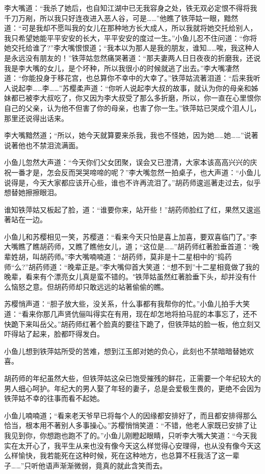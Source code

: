 \documentclass[12pt,oneside]{book}
\begin{document}
李大嘴道：``我杀了她后，也自知江湖中已无我容身之处，铁无双必定恨不得将我千刀万剐，所以我只好连夜进入恶人谷，可是\ldots\ldots{}''他瞧了铁萍姑一眼，黯然道：``可是我却不愿叫我的女儿在那种地方长大成人，所以我就将她交托给别人，我只希望她能平平安安的长大，平平安安的度过一生。''小鱼儿忍不住问道：``你将她交托给谁了?''李大嘴恨恨道；``我本以为那人是我的朋友，谁知\ldots\ldots 唉，我这种人是永远没有朋友的！''铁萍姑忽然痛哭著道：``那夫妻两人日日夜夜的折磨我，还说我是李大嘴的女儿，是个坏种，所以我很小的时候就逃了出去。''李大嘴凄然道：``你能投身于移花宫，也总算你不幸中的大幸了。''铁萍姑流著泪道：``后来我听人说起李\ldots\ldots 李\ldots\ldots{}''苏樱柔声道：``你听人说起李大叔的故事，就认为你的母亲和姊妹都已被李大叔吃了，你又因为李大叔受了那么多折磨，所以，你一直在心里恨你自己的父亲，认为他不但害了你的母亲，也害了你一生。''铁萍姑已哭成个泪人儿，那里还说得出话来。

李大嘴黯然道；``所以，她今天就算要来杀我，我也不怪她，因为她\ldots\ldots 她\ldots\ldots{}''说著说著他也不禁泪流满面。

小鱼儿忽然大声道：``今天你们父女团聚，误会又已澄清，大家本该高高兴兴的庆祝一番才是，怎会反而哭哭啼啼的呢？''李大嘴忽然一拍桌子，也大声道：``小鱼儿说得是，今天大家都应该开心些，谁也不许再流泪了。''胡药师逡巡著走过去，似乎想替她擦擦眼泪。

谁知铁萍姑又板起了脸，道：``谁要你来，站开些！''胡药师脸红了红，果然又逡巡著站在一边。

小鱼儿和苏樱相见一笑，苏樱道：``看来今天只怕是喜上加喜，要双喜临门了。''李大嘴瞧了瞧胡药师，又瞧了瞧他女儿，道；``这位是\ldots\ldots{}''胡药师红著脸垂首道：``晚辈姓胡，叫胡药师。''李大嘴喃喃道：``胡药师，莫非是十二星相中的''捣药师``么?''胡药师道：``晚辈正是。''李大嘴仰首大笑道：``想不到''十二星相竟做了我的晚辈，看来有个漂亮女儿真是蛮不错的。"铁萍姑虽然红著脸垂下头，却并没有什么恼怒之意。但胡药师却只敢远远的站著偷偷的瞧。

苏樱悄声道：``胆子放大些，没关系，什么事都有我帮你的忙。''小鱼儿拍手大笑道：``看来你那几声贤伉俪叫得实在有用，现在却怎地将拍马屁的本事忘了，还不快跪下来叫岳父。''胡药师红著个脸真的要往下跪了，但铁萍姑的脸一板，他立刻又吓得站了起来，脸都吓得发白。

小鱼儿想到铁萍姑所受的苦难，想到江玉郎对她的负心，此刻也不禁暗暗替她欢喜。

胡药师的年纪虽然大些，但铁萍姑这朵已饱受摧残的鲜花，正需要一个年纪较大的男人细心呵护。年纪大的男人娶了年轻的妻子，总是会爱极生畏的，更绝不会因为铁萍姑不幸的往事而看不起她。

小鱼儿喃喃道；``看来老天爷早已将每个人的因缘都安排好了，而且都安排得那么恰当，根本用不著别人多事操心。''苏樱悄悄笑道：``不错，他老人家既已安排了让我见到你，你想跑也跑不了的。''小鱼儿刚瞪起眼睛，只听李大嘴大笑道：``今天我实在太开心了，我平生从来也没有像今天这么样觉得心安理得，也从没有像今天这么样愉快，我若能死在这种时候，死在这种地方，也总算不枉我活了这一辈子\ldots\ldots{}''只听他语声渐渐微弱，竟真的就此含笑而去。
\end{document}

